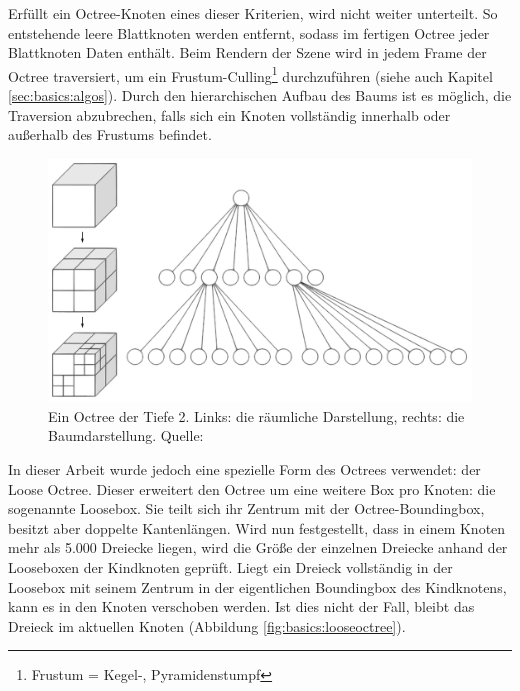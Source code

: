 Erfüllt ein Octree-Knoten eines dieser Kriterien, wird nicht weiter unterteilt. So entstehende leere Blattknoten werden entfernt, sodass im fertigen Octree jeder Blattknoten Daten enthält. Beim Rendern der Szene wird in jedem Frame der Octree traversiert, um ein Frustum-Culling\footnote{Frustum = Kegel-, Pyramidenstumpf} durchzuführen (siehe auch Kapitel \ref{sec:basics:algos}). Durch den hierarchischen Aufbau des Baums ist es möglich, die Traversion abzubrechen, falls sich ein Knoten vollständig innerhalb oder außerhalb des Frustums befindet.

\begin{figure}
 \centering
  \includegraphics[scale=0.5]{images/octree.pdf}
  \caption{Ein Octree der Tiefe 2. Links: die räumliche Darstellung, rechts: die Baumdarstellung. Quelle:}
 \label{fig:basics:octree}
\end{figure}
In dieser Arbeit wurde jedoch eine spezielle Form des Octrees verwendet: der Loose Octree. Dieser erweitert den Octree um eine weitere Box pro Knoten: die sogenannte Loosebox. Sie teilt sich ihr Zentrum mit der Octree-Boundingbox, besitzt aber doppelte Kantenlängen. Wird nun festgestellt, dass in einem Knoten mehr als 5.000 Dreiecke liegen, wird die Größe der einzelnen Dreiecke anhand der Looseboxen der Kindknoten geprüft. Liegt ein Dreieck vollständig in der Loosebox mit seinem Zentrum in der eigentlichen Boundingbox des Kindknotens, kann es in den Knoten verschoben werden. Ist dies nicht der Fall, bleibt das Dreieck im aktuellen Knoten (Abbildung \ref{fig:basics:looseoctree}).



